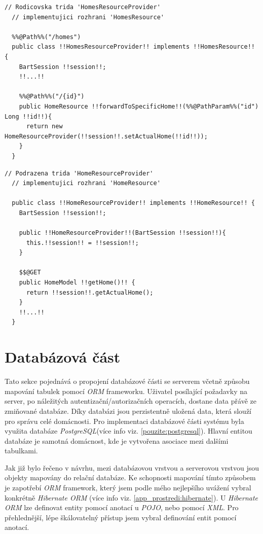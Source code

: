 \begin{lstlisting}[style=JavaStyle, caption={Ukázka přesměrování požadavku}]
  // Rodicovska trida 'HomesResourceProvider'
  // implementujici rozhrani 'HomesResource'

  %%@Path%%("/homes")
  public class !!HomesResourceProvider!! implements !!HomesResource!! {
    BartSession !!session!!;
    !!...!!

    %%@Path%%("/{id}")
    public HomeResource !!forwardToSpecificHome!!(%%@PathParam%%("id") Long !!id!!){
      return new HomeResourceProvider(!!session!!.setActualHome(!!id!!));
    }
  }
\end{lstlisting}

\begin{lstlisting}[style=JavaStyle, caption={Ukázka zpracování požadavku z přesměrované třídy}]
  // Podrazena trida 'HomeResourceProvider'
  // implementujici rozhrani 'HomeResource'

  public class !!HomeResourceProvider!! implements !!HomeResource!! {
    BartSession !!session!!;

    public !!HomeResourceProvider!!(BartSession !!session!!){
      this.!!session!! = !!session!!;
    }

    $$@GET
    public HomeModel !!getHome()!! {
      return !!session!!.getActualHome();
    }
    !!...!!
  }
\end{lstlisting}

\newpage
\section{Databázová část}
\label{impl:databaze}
Tato sekce pojednává o propojení databázové části se serverem včetně způsobu mapování tabulek pomocí \emph{ORM} frameworku.
Uživatel posílající požadavky na server, po náležitých autentizační/autorizačních operacích, dostane data přávě ze zmiňované databáze.
Díky databázi jsou perzistentně uložená data, která slouží pro správu celé domácnosti.
Pro implementaci databázové části systému byla využita databáze \emph{PostgreSQL}(více info viz. \ref{pouzite:postgresql}).
Hlavní entitou databáze je samotná domácnost, kde je vytvořena asociace mezi dalšími tabulkami.

Jak již bylo řečeno v návrhu, mezi databázovou vrstvou a serverovou vrstvou jsou objekty mapovány do relační databáze.
Ke schopnosti mapování tímto způsobem je zapotřebí \emph{ORM} framework, který jsem podle mého nejlepšího uvážení vybral konkrétně \emph{Hibernate ORM} (více info viz. \ref{app_prostredi:hibernate}).
U \emph{Hibernate ORM} lze definovat entity pomocí anotací u \emph{POJO}, nebo pomocí \emph{XML}.
Pro přehlednější, lépe škálovatelný přístup jsem vybral definování entit pomocí anotací.


